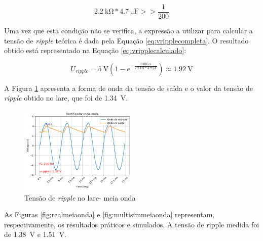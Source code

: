\begin{equation} \label{eq:verificarcondicao}
	\SI{2.2}{\kilo\ohm} * \SI{4.7}{\micro\farad} >> \dfrac{1}{200}
\end{equation}

Uma vez que esta condição não se verifica, a expressão a utilizar para calcular a tensão de \textit{ripple} teórica é dada pela Equação \ref{eq:vripplecompleta}. O resultado obtido está representado na Equação \ref{eq:vripplecalculado}:

\begin{equation} \label{eq:vripplecalculado}
	U_{ripple} = \SI{5}{\volt}(1-e^{-\frac{\SI{0.005}{\second}}{\SI{2.2}{\kilo\ohm}*\SI{4.7}{\micro\farad}}}) \approx \SI{1.92}{\volt}
\end{equation}

A Figura \ref{fig:ripplelaremeiaonda} apresenta a forma de onda da tensão de saída e o valor da tensão de \textit{ripple} obtido no \acrshort{lare}, que foi de \SI{1.34}{\volt}.

\begin{figure}[hbtp]
	\centering
	\includegraphics[width=0.5\textwidth]{figures/resultados_LaRE_meia_onda.png}
	\caption{Tensão de \textit{ripple} no \acrshort{lare}- meia onda}
	\label{fig:ripplelaremeiaonda}
\end{figure}

As Figuras \ref{fig:realmeiaonda} e \ref{fig:multisimmeiaonda} representam, respectivamente, os resultados práticos e simulados. A tensão de ripple medida foi de \SI{1.38}{\volt} e \SI{1.51}{\volt}.

